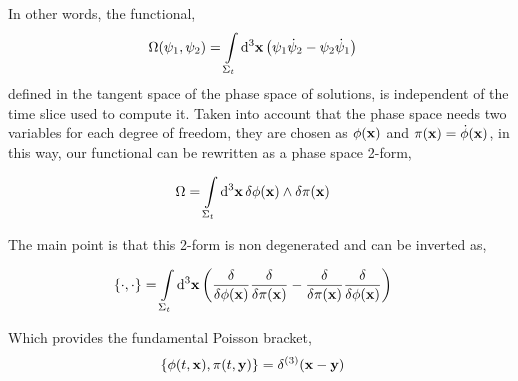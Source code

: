 In other words, the functional,
\begin{align}
    \Omega\qty(\psi_1,\psi_2) &= \int\limits_{\Sigma_t}\dd[3]{\vb x}\qty(\psi_1\dot\psi_2-\psi_2\dot\psi_1)
\end{align}
defined in the tangent space of the phase space of solutions, is independent of the time slice used to compute it. Taken 
into account that the phase space needs two variables for each degree of freedom, they are chosen as $\phi(\vb x)$ and $\pi\qty(\vb x)=\dot\phi\qty(\vb x)$, 
in this way, our functional can be rewritten as a phase space 2-form,

\begin{align}
    \Omega &= \int\limits_{\Sigma_t}\dd[3]{\vb x}\delta\phi\qty(\vb x)\wedge\delta\pi\qty(\vb x)
\end{align}

The main point is that this 2-form is non degenerated and can be inverted as,

\begin{align}
    \acomm{\cdot}{\cdot} &= \int\limits_{\Sigma_t}\dd[3]{\vb x}\qty(\fdv{}{\phi\qty(\vb x)}\fdv{}{\pi\qty(\vb x)}-\fdv{}{\pi\qty(\vb x)}\fdv{}{\phi\qty(\vb x)})
\end{align}

Which provides the fundamental Poisson bracket,
\begin{align}
    \acomm{\phi\qty(t,\vb x)}{\pi\qty(t,\vb y)}&=\delta^{(3)}\qty(\vb x-\vb y) 
\end{align}


